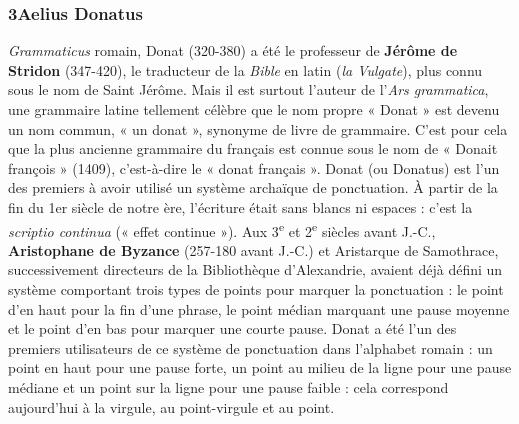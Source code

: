 \subsubsection*{3\quad Aelius Donatus}
\textit{Grammaticus} romain, Donat (320-380) a été le professeur de \textbf{Jérôme de Stridon} (347-420), le traducteur de la \textit{Bible} en latin (\textit{la Vulgate}), plus connu sous le nom de Saint Jérôme. Mais il est surtout l’auteur de l’\textit{Ars grammatica}, une grammaire latine tellement célèbre que le nom propre « Donat » est devenu un nom commun, « un donat », synonyme de livre de grammaire. C’est pour cela que la plus ancienne grammaire du français est connue sous le nom de « Donait françois » (1409), c’est-à-dire le « donat français ».
Donat (ou Donatus) est l’un des premiers à avoir utilisé un système archaïque de ponctuation. À partir de la fin du 1er siècle de notre ère, l’écriture était sans blancs ni espaces : c’est la \textit{scriptio continua} (« effet continue »). Aux 3\textsuperscript{e} et 2\textsuperscript{e} siècles avant J.-C., \textbf{Aristophane de Byzance} (257-180 avant J.-C.) et Aristarque de Samothrace, successivement directeurs de la Bibliothèque d’Alexandrie, avaient déjà défini un système comportant trois types de points pour marquer la ponctuation : le point d’en haut pour la fin d’une phrase, le point médian marquant une pause moyenne et le point d’en bas pour marquer une courte pause. Donat a été l’un des premiers utilisateurs de ce système de ponctuation dans l’alphabet romain : un point en haut pour une pause forte, un point au milieu de la ligne pour une pause médiane et un point sur la ligne pour une pause faible : cela correspond aujourd’hui à la virgule, au point-virgule et au point.


